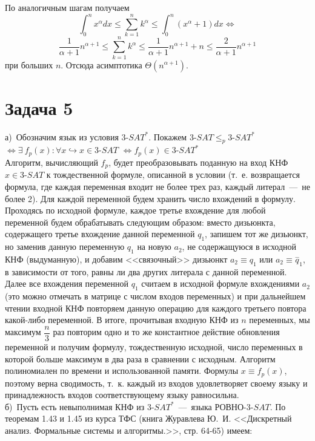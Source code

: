 \documentclass[a4paper,12pt]{article} %
\begin{document}
По аналогичным шагам получаем 
\[
\int_{0}^{n}{x^{\alpha}dx} \leq \sum_{k=1}^{n}{k^{\alpha}}
\leq\int_{0}^{n}{(x^{\alpha}+1)dx}\Leftrightarrow
\]
\[
\dfrac{1}{\alpha+1}n^{\alpha+1}\leq \sum_{k=1}^{n}{k^{\alpha}}
\leq\dfrac{1}{\alpha+1}n^{\alpha+1}+n \leq \dfrac{2}{\alpha+1}n^{\alpha+1} 
\]
при больших $n$. Отсюда асимптотика $\Theta(n^{\alpha+1})$.\\

\section*{Задача 5} 
а)~Обозначим язык из условия $3$-$SAT^*$. Покажем $3$-$ SAT \leq_p 3$-$SAT^*$ 
$\Leftrightarrow \exists~f_p(x): \forall x \hookrightarrow x \in 3$-$SAT$ $\Leftrightarrow f_p(x) \in 3$-$ SAT^*$\\

Алгоритм, вычисляющий $f_p$, будет преобразовывать поданную на вход КНФ $x \in 3\text{-}SAT$ к тождественной формуле, описанной в условии (т.~е. возвращается формула, где каждая переменная входит не более трех раз, каждый литерал~---~не более 2). Для каждой переменной будем хранить число вхождений в формулу. Проходясь по исходной формуле, каждое третье вхождение для любой переменной будем обрабатывать следующим образом: вместо дизьюнкта, содержащего третье вхождение данной переменной $q_1$, запишем тот же дизьюнкт, но заменив данную переменную $q_1$ на новую $a_2$, не содержащуюся в исходной КНФ (выдуманную), и добавим <<связочный>> дизьюнкт $a_2 \equiv q_1$ или $a_2 \equiv \overset{-}q_1$, в зависимости от того, равны ли два других литерала с данной переменной. Далее все вхождения переменной $q_1$ считаем в исходной формуле вхождениями $a_2$ (это можно отмечать в матрице с числом входов переменных) и при дальнейшем чтении входной КНФ повторяем данную операцию для каждого третьего повтора какой-либо переменной. В итоге, прочитывая входную КНФ из $n$ переменных, мы максимум $\dfrac{n}{3}$ раз повторим одно и то же константное действие обновления переменной и получим формулу, тождественную исходной, число переменных в которой больше максимум в два раза в сравнении с исходным. Алгоритм полиномиален по времени и использованной памяти. Формулы $x \equiv f_p(x)$, поэтому верна сводимость, т.~к. каждый из входов удовлетворяет своему языку и принадлежность входов соответствующему языку равносильна.\\

\noindent б)~Пусть есть невыполнимая КНФ из $3$-$SAT^*$~---~языка РОВНО-3-$SAT$. По теоремам 1.43 и 1.45 из курса ТФС (книга Журавлева Ю.~И. <<Дискретный анализ. Формальные системы и алгоритмы.>>, стр. 64-65) имеем:\\
\end{document}

